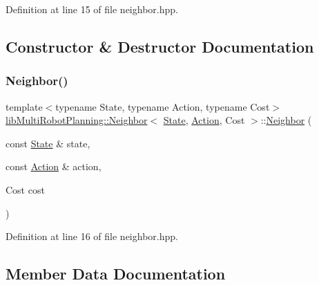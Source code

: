 Definition at line 15 of file neighbor.\+hpp.



\subsection{Constructor \& Destructor Documentation}
\mbox{\label{structlib_multi_robot_planning_1_1_neighbor_a048152420e26c75abca920a4c5060c42}} 
\subsubsection{\texorpdfstring{Neighbor()}{Neighbor()}}
{\footnotesize\ttfamily template$<$typename State, typename Action, typename Cost$>$ \\
\hyperlink{structlib_multi_robot_planning_1_1_neighbor}{lib\+Multi\+Robot\+Planning\+::\+Neighbor}$<$ \hyperlink{structlib_multi_robot_planning_1_1_state}{State}, \hyperlink{namespacelib_multi_robot_planning_aba73fb71693f86a324adfa0e41e1053d}{Action}, Cost $>$\+::\hyperlink{structlib_multi_robot_planning_1_1_neighbor}{Neighbor} (\begin{DoxyParamCaption}\item[{const \hyperlink{structlib_multi_robot_planning_1_1_state}{State} \&}]{state,  }\item[{const \hyperlink{namespacelib_multi_robot_planning_aba73fb71693f86a324adfa0e41e1053d}{Action} \&}]{action,  }\item[{Cost}]{cost }\end{DoxyParamCaption})\hspace{0.3cm}{\ttfamily [inline]}}



Definition at line 16 of file neighbor.\+hpp.



\subsection{Member Data Documentation}
\mbox{\label{structlib_multi_robot_planning_1_1_neighbor_a8b50ab4edc18e97d809dcd89c42bed44}} 
